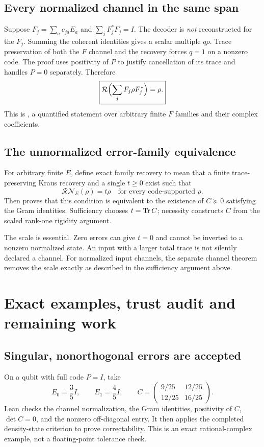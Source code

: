 \subsection{Every normalized channel in the same span}
Suppose $F_j=\sum_a c_{ja}E_a$ and $\sum_jF_j^*F_j=I$. The decoder is \emph{not} reconstructed for the $F_j$. Summing the coherent identities gives a scalar multiple $q\rho$. Trace preservation of both the $F$ channel and the recovery forces $q=1$ on a nonzero code. The proof uses positivity of $P$ to justify cancellation of its trace and handles $P=0$ separately. Therefore
\[
\boxed{\mathcal R\Bigl(\sum_jF_j\rho F_j^*\Bigr)=\rho.}
\]
This is , a quantified statement over arbitrary finite $F$ families and their complex coefficients.

\subsection{The unnormalized error-family equivalence}
For arbitrary finite $E$, define exact family recovery to mean that a finite trace-preserving Kraus recovery and a single $t\ge0$ exist such that
\[
\mathcal R\mathcal N_E(\rho)=t\rho
\quad\text{for every code-supported }\rho.
\]
Then  proves that this condition is equivalent to the existence of $C\succeq0$ satisfying the Gram identities. Sufficiency chooses $t=\operatorname{Tr} C$; necessity constructs $C$ from the scaled rank-one rigidity argument.

The scale is essential. Zero errors can give $t=0$ and cannot be inverted to a nonzero normalized state. An input with a larger total trace is not silently declared a channel. For normalized input channels, the separate channel theorem removes the scale exactly as described in the sufficiency argument above.



\section{Exact examples, trust audit and remaining work}\label{supp5:section:006}
\subsection{Singular, nonorthogonal errors are accepted}
On a qubit with full code $P=I$, take
\[
E_0=\frac35I,\qquad E_1=\frac45I,\qquad
C=\begin{pmatrix}9/25&12/25\\12/25&16/25\end{pmatrix}.
\]
Lean checks the channel normalization, the Gram identities, positivity of $C$, $\det C=0$, and the nonzero off-diagonal entry. It then applies the completed density-state criterion to prove correctability. This is an exact rational-complex example, not a floating-point tolerance check.

